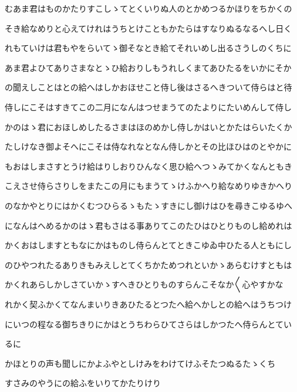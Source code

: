 \documentclass[a4paper,11pt,landscape]{ltjtarticle}
\begin{document}
\par\medskip
むあま君はものかたりすこしゝてとくいりぬ人のとかめつるかほりをちかくの
\par\medskip
そき給なめりと心えてけれはうちとけこともかたらはすなりぬるなるへし日く
\par\medskip
れもていけは君もやをらいてゝ御そなとき給てそれいめし出るさうしのくちに
\par\medskip
あま君よひてありさまなとゝひ給おりしもうれしくまてあひたるをいかにそか
\par\medskip
の聞えしことはとの給へはしかおほせこと侍し後はさるへきついて侍らはと待
\par\medskip
侍しにこそはすきてこの二月になんはつせまうてのたよりにたいめんして侍し
\par\medskip
かのはゝ君におほしめしたるさまはほのめかし侍しかはいとかたはらいたくか
\par\medskip
たしけなき御よそへにこそは侍なれなとなん侍しかとその比ほひはのとやかに
\par\medskip
もおはしまさすとうけ給はりしおりひんなく思ひ給へつゝみてかくなんともき
\par\medskip
こえさせ侍らさりしをまたこの月にもまうてゝけふかへり給なめりゆきかへり
\par\medskip
のなかやとりにはかくむつひらるゝもたゝすきにし御けはひを尋きこゆるゆへ
\par\medskip
になんはへめるかのはゝ君もさはる事ありてこのたひはひとりものし給めれは
\par\medskip
かくおはしますともなにかはものし侍らんとてときこゆゐ中ひたる人ともにし
\par\medskip
のひやつれたるありきもみえしとてくちかためつれといかゝあらむけすともは
\par\medskip
かくれあらしかしさていかゝすへきひとりものすらんこそなか〱心やすかな
\par\medskip
れかく契ふかくてなんまいりきあひたるとつたへ給へかしとの給へはうちつけ
\par\medskip
にいつの程なる御ちきりにかはとうちわらひてさらはしかつたへ侍らんとてい
\par\medskip
るに
\par\medskip
かほとりの声も聞しにかよふやとしけみをわけてけふそたつぬるたゝくち
\par\medskip
すさみのやうにの給ふをいりてかたりけり
\par\medskip
\end{document}

